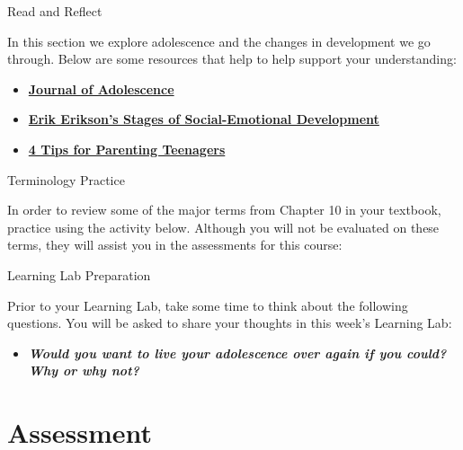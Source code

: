 \documentclass[
]{book}
\providecommand{\tightlist}{%
  \setlength{\itemsep}{0pt}\setlength{\parskip}{0pt}}
\begin{document}
\begin{reflect}
{Read and Reflect}

In this section we explore adolescence and the changes in development we go through. Below are some resources that help to help support your understanding:

\begin{itemize}
\tightlist
\item
  \href{https://www.sciencedirect.com/journal/journal-of-adolescence}{\textbf{Journal of Adolescence}}\\
\item
  \href{https://childdevelopmentinfo.com/child-development/erickson/\#gs.d8mpcv}{\textbf{Erik Erikson's Stages of Social-Emotional Development}}\\
\item
  \href{http://drjamesdobson.org/quiz/parenting-quiz/4-tips-for-parenting-teenagers}{\textbf{4 Tips for Parenting Teenagers}}
\end{itemize}

{Terminology Practice}

In order to review some of the major terms from Chapter 10 in your textbook, practice using the activity below. Although you will not be evaluated on these terms, they will assist you in the assessments for this course:

{Learning Lab Preparation}

Prior to your Learning Lab, take some time to think about the following questions. You will be asked to share your thoughts in this week's Learning Lab:

\begin{itemize}
\tightlist
\item
  \textbf{\emph{Would you want to live your adolescence over again if you could? Why or why not?}}
\end{itemize}
\end{reflect}

\hypertarget{assessment-2}{%
\section*{Assessment}\label{assessment-2}}
\end{document}
